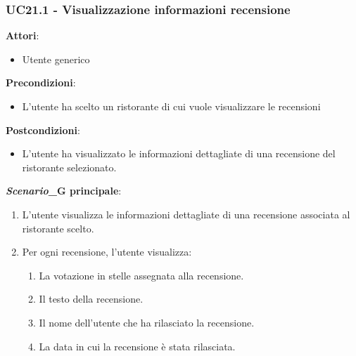 \subsubsection{UC21.1 - Visualizzazione informazioni recensione}\label{usecase:21_1}
\textbf{Attori}:
\begin{itemize}
    \item Utente generico
\end{itemize}
\textbf{Precondizioni}:
\begin{itemize}
    \item L'utente ha scelto un ristorante di cui vuole visualizzare le recensioni
\end{itemize}
\textbf{Postcondizioni}:
\begin{itemize}
    \item L'utente ha visualizzato le informazioni dettagliate di una recensione del ristorante selezionato.
\end{itemize}
\textbf{\textit{Scenario}_G principale}:
\begin{enumerate}
    \item L'utente visualizza le informazioni dettagliate di una recensione associata al ristorante scelto.
    \item Per ogni recensione, l'utente visualizza:
    \begin{enumerate}
        \item La votazione in stelle assegnata alla recensione.
        \item Il testo della recensione.
        \item Il nome dell'utente che ha rilasciato la recensione.
        \item La data in cui la recensione è stata rilasciata.
    \end{enumerate}
\end{enumerate}

\newpage